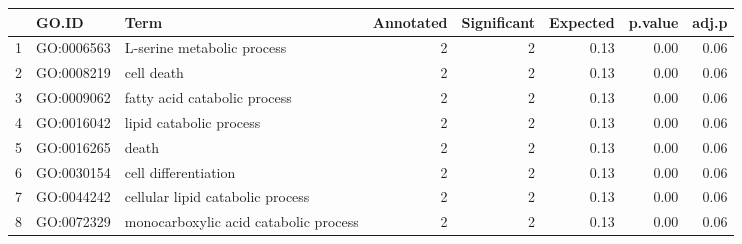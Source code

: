 \begin{table}[ht]
\centering
\begin{tabular}{rllrrrrr}
  \hline
 & GO.ID & Term & Annotated & Significant & Expected & p.value & adj.p \\ 
  \hline
1 & GO:0006563 & L-serine metabolic process &   2 &   2 & 0.13 & 0.00 & 0.06 \\ 
  2 & GO:0008219 & cell death &   2 &   2 & 0.13 & 0.00 & 0.06 \\ 
  3 & GO:0009062 & fatty acid catabolic process &   2 &   2 & 0.13 & 0.00 & 0.06 \\ 
  4 & GO:0016042 & lipid catabolic process &   2 &   2 & 0.13 & 0.00 & 0.06 \\ 
  5 & GO:0016265 & death &   2 &   2 & 0.13 & 0.00 & 0.06 \\ 
  6 & GO:0030154 & cell differentiation &   2 &   2 & 0.13 & 0.00 & 0.06 \\ 
  7 & GO:0044242 & cellular lipid catabolic process &   2 &   2 & 0.13 & 0.00 & 0.06 \\ 
  8 & GO:0072329 & monocarboxylic acid catabolic process &   2 &   2 & 0.13 & 0.00 & 0.06 \\ 
   \hline
\end{tabular}
\end{table}
